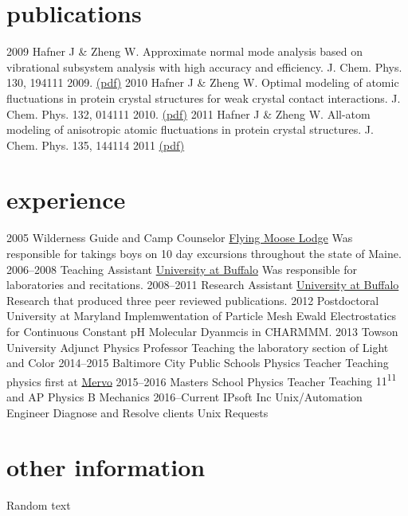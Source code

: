 \documentclass[]{twentysecondcv}
\begin{document}
\section{publications}

\begin{twentyshort}
  \twentyitemshort
     {2009}
     {Hafner J \& Zheng W. Approximate normal mode analysis based on vibrational subsystem analysis with high accuracy and efficiency. J. Chem. Phys. 130, 194111 2009.  \href{http://www.acsu.buffalo.edu/~wjzheng/Hafner_jcp2009.pdf}{(pdf)}}
  \twentyitemshort
     {2010}
     {Hafner J \& Zheng W. Optimal modeling of atomic fluctuations in protein crystal structures for weak crystal contact interactions. J. Chem. Phys. 132, 014111 2010. \href{http://www.acsu.buffalo.edu/~wjzheng/Hafner_jcp2010.pdf}{(pdf)}}
  \twentyitemshort
     {2011}
     {Hafner J \& Zheng W. All-atom modeling of anisotropic atomic fluctuations in protein crystal structures. J. Chem. Phys. 135, 144114 2011 \href{http://www.acsu.buffalo.edu/\~{}wjzheng/Hafner_jcp2011.pdf}{(pdf)}}
\end{twentyshort}



\section{experience}

\begin{twenty}
  \twentyitem
    {2005}
    {Wilderness Guide and Camp Counselor}
    {\href{www.flyingmooselodge.com}{Flying Moose Lodge}}
    {Was responsible for takings boys on 10 day excursions throughout the state of Maine.}
  \twentyitem
    {2006--2008}
    {Teaching Assistant}
    {\href{www.andrews.edu}{University at Buffalo}}
    {Was responsible for laboratories and recitations.}
  \twentyitem
    {2008--2011}
    {Research Assistant}
    {\href{www.buffalo.edu}{University at Buffalo}}
    {Research that produced three peer reviewed publications.}
  \twentyitem
    {2012}
    {Postdoctoral}
    {University at Maryland}
    {Implemwentation of Particle Mesh Ewald Electrostatics for Continuous Constant pH Molecular Dyanmcis in CHARMMM.}
\twentyitem
    {2013}
    {Towson University}
    {Adjunct Physics Professor}
    {Teaching the laboratory section of Light and Color}
\twentyitem
    {2014--2015}
    {Baltimore City Public Schools}
    {Physics Teacher}
    {Teaching physics first at \href{http://mervo.org}{Mervo}}
\twentyitem
    {2015--2016}
    {Masters School}
    {Physics Teacher}
    {Teaching 11\textsuperscript{11} and AP Physics B Mechanics}
\twentyitem
    {2016--Current}
    {IPsoft Inc}
    {Unix/Automation Engineer}
    {Diagnose and Resolve clients Unix Requests}
\end{twenty}
\section{other information}
Random text

\end{document}
